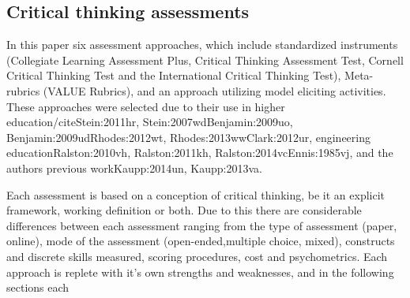 \subsection{Critical thinking assessments}

In this paper six assessment approaches, which include standardized instruments (Collegiate Learning Assessment Plus, Critical Thinking Assessment Test, Cornell Critical Thinking Test and the International Critical Thinking Test), Meta-rubrics (VALUE Rubrics), and an approach utilizing model eliciting activities.  These approaches were selected due to their use in higher education/cite{Stein:2011hr, Stein:2007wd}{Benjamin:2009uo, Benjamin:2009ud}{Rhodes:2012wt, Rhodes:2013ww}{Clark:2012ur}, engineering education{Ralston:2010vh, Ralston:2011kh, Ralston:2014vc}{Ennis:1985vj}, and the authors previous work{Kaupp:2014un, Kaupp:2013va}.

Each assessment is based on a conception of critical thinking, be it an explicit framework, working definition or both.  Due to this there are considerable differences between each assessment ranging from the type of assessment (paper, online), mode of the assessment (open-ended,multiple choice, mixed), constructs and discrete skills measured, scoring procedures, cost and psychometrics.   Each approach is replete with it’s own strengths and weaknesses, and in the following sections each 
